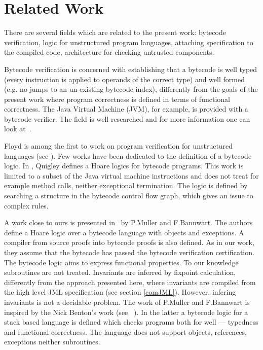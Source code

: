 \section{Related Work} \label{relWork}
    
There are several fields which are related to the present work: bytecode verification, logic for unstructured program languages, attaching specification to the compiled code, architecture for checking untrusted components.

 Bytecode verification is concerned with establishing that a bytecode is well typed 
(every instruction is applied to operands of the correct type) and well formed 
(e.g. no jumps to an un-existing bytecode index), differently from the goals of the present
work where program correctness is defined in terms of functional correctness. The Java Virtual Machine (JVM), for example, is provided with a bytecode verifier. 
The field is well researched and for more information one can look at~\cite{Ljbc}.  

Floyd is among the first to work on program verification for unstructured languages (see \cite{F67amp}).
Few works have been dedicated to the definition of a bytecode logic. In \cite{Quigley}, Quigley defines a Hoare logics for bytecode programs. 
 This work is limited to a subset of the Java virtual machine instructions and does not treat for example method calls, 
 neither exceptional termination. The logic is defined by searching a structure in the bytecode control flow graph, 
 which gives an issue to complex rules.

A work close to ours is presented in~\cite{BM05plb} by P.Muller and F.Bannwart. The authors define a Hoare logic over a 
bytecode language with objects and  exceptions. A compiler from source proofs into bytecode proofs is also defined. 
As in our work, they assume that the bytecode has passed the bytecode verification certification. The bytecode logic aims to 
express functional properties. To our knowledge subroutines are not treated. Invariants are inferred by fixpoint calculation, differently 
from the approach presented here, where invariants are compiled from the high level JML specification (see section \ref{comJML}). 
However, infering invariants is not a decidable problem. The work of P.Muller and F.Bannwart is inspired by the Nick Benton's work (see ~\cite{B04tlsj}). 
In the latter a bytecode logic for a stack based language is defined which checks programs both for well --- typedness and functional correctness. 
 The language does not support objects, references, exceptions neither subroutines. 

